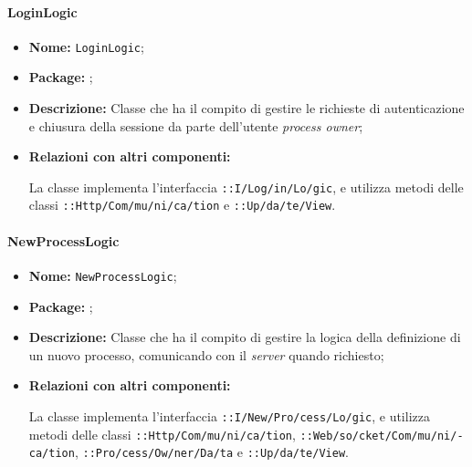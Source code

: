 \paragraph{LoginLogic}
\begin{flushleft}
\begin{itemize}
\item \textbf{Nome:} \texttt{LoginLogic};
\item \textbf{Package:} \texttt{\logicAdmin{}};
\item \textbf{Descrizione:} Classe che ha il compito di gestire le richieste di autenticazione e chiusura della sessione da parte dell'utente \textit{process owner};
\item \textbf{Relazioni con altri componenti:}
\begin{sloppypar}
La classe implementa l'interfaccia \texttt{\iLogicAdmin{}::I\fshyp{}Log\fshyp{}in\fshyp{}Lo\fshyp{}gic}, e utilizza metodi delle classi \texttt{\serverCommunication{}::Http\fshyp{}Com\fshyp{}mu\fshyp{}ni\fshyp{}ca\fshyp{}tion} e \texttt{\viewAdmin{}::Up\fshyp{}da\fshyp{}te\fshyp{}View}.
\end{sloppypar}
\end{itemize}
\end{flushleft}

\paragraph{NewProcessLogic}
\begin{flushleft}
\begin{itemize}
\item \textbf{Nome:} \texttt{NewProcessLogic};
\item \textbf{Package:} \texttt{\logicAdmin{}};
\item \textbf{Descrizione:} Classe che ha il compito di gestire la logica della definizione di un nuovo processo, comunicando con il \textit{server} quando richiesto;
\item \textbf{Relazioni con altri componenti:}
\begin{sloppypar}
La classe implementa l'interfaccia \texttt{\iLogicAdmin{}::I\fshyp{}New\fshyp{}Pro\fshyp{}cess\fshyp{}Lo\fshyp{}gic}, e utilizza metodi delle classi \texttt{\serverCommunication{}::Http\fshyp{}Com\fshyp{}mu\fshyp{}ni\fshyp{}ca\fshyp{}tion}, \texttt{\serverCommunication{}::Web\fshyp{}so\fshyp{}cket\fshyp{}Com\fshyp{}mu\fshyp{}ni\fshyp{}ca\fshyp{}tion}, \texttt{\modelAdmin{}::Pro\fshyp{}cess\fshyp{}Ow\fshyp{}ner\fshyp{}Da\fshyp{}ta} e \texttt{\viewAdmin{}::Up\fshyp{}da\fshyp{}te\fshyp{}View}.
\end{sloppypar}
\end{itemize}
\end{flushleft}

